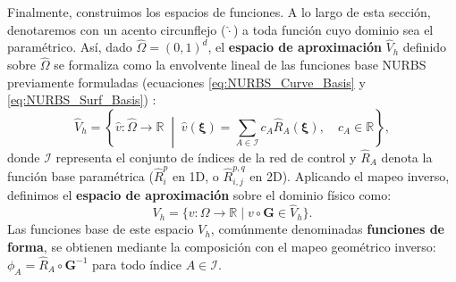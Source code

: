 \documentclass[11pt]{book}
\theoremstyle{plain} %
\theoremstyle{definition} %
\theoremstyle{definition} %
\begin{document}
Finalmente, construimos los espacios de funciones. A lo largo de esta sección, denotaremos con un acento circunflejo ($\hat{\cdot}$) a toda función cuyo dominio sea el paramétrico. Así, dado $\hat{\Omega} = (0,1)^d$, el \textbf{espacio de aproximación} $\hat{V}_h$ definido sobre $\hat{\Omega}$ se formaliza como la envolvente lineal de las funciones base NURBS previamente formuladas (ecuaciones \eqref{eq:NURBS_Curve_Basis} y \eqref{eq:NURBS_Surf_Basis}) \cite{buffa_mathematical_2022}:
\begin{equation*}
    \hat{V}_h = \left\{ \hat{v} : \hat{\Omega} \to \mathbb{R} \;\middle|\; \hat{v}(\boldsymbol{\xi}) = \sum_{A \in \mathcal{I}} c_A \hat{R}_A(\boldsymbol{\xi}), \quad c_A \in \mathbb{R} \right\},
\end{equation*}
donde $\mathcal{I}$ representa el conjunto de índices de la red de control y $\hat{R}_A$ denota la función base paramétrica ($\hat{R}_i^p$ en 1D, o $\hat{R}_{i,j}^{p,q}$ en 2D). Aplicando el mapeo inverso, definimos el \textbf{espacio de aproximación} sobre el dominio físico como:
\begin{equation*}
    V_h = \Big\{ v : \Omega \to \mathbb{R} \mid v \circ \mathbf{G} \in \hat{V}_h \Big\}.
\end{equation*}
Las funciones base de este espacio $V_h$, comúnmente denominadas \textbf{funciones de forma}, se obtienen mediante la composición con el mapeo geométrico inverso: $\phi_A = \hat{R}_A \circ \mathbf{G}^{-1}$ para todo índice $A \in \mathcal{I}$.
\end{document}
